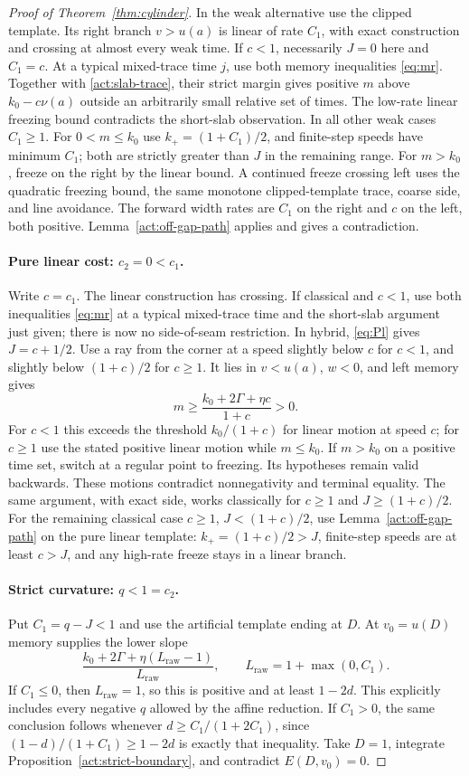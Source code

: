 \begin{proof}[Proof of Theorem~\ref{thm:cylinder}]
In the weak alternative use the clipped template.  Its right
branch $v>u(a)$ is linear of rate $C_1$, with exact construction
and crossing at almost every weak time.  If $c<1$, necessarily
$J=0$ here and $C_1=c$.  At a typical mixed-trace time $j$, use
both memory inequalities \eqref{eq:mr}.  Together with
\eqref{act:slab-trace}, their strict margin gives positive $m$
above $k_0-c\nu(a)$ outside an arbitrarily small relative set
of times.  The low-rate linear freezing bound contradicts the
short-slab observation.  In all other weak cases $C_1\ge1$.
For $0<m\le k_0$ use $k_+=(1+C_1)/2$, and finite-step speeds
have minimum $C_1$; both are strictly greater than $J$ in the
remaining range.  For $m>k_0$, freeze on the right by the linear
bound.  A continued freeze crossing left uses the quadratic
freezing bound, the same monotone clipped-template trace,
coarse side, and line avoidance.  The forward width rates are
$C_1$ on the right and $c$ on the left, both positive.
Lemma~\ref{act:off-gap-path} applies and gives a contradiction.

\paragraph{Pure linear cost: $c_2=0<c_1$.}
Write $c=c_1$.  The linear construction has crossing.
If classical and $c<1$, use both inequalities \eqref{eq:mr}
at a typical mixed-trace time and the short-slab argument just
given; there is now no side-of-seam restriction.
In hybrid, \eqref{eq:Pl} gives $J=c+1/2$.  Use a ray from the
corner at a speed slightly below $c$ for $c<1$, and slightly
below $(1+c)/2$ for $c\ge1$.  It lies in $v<u(a)$, $w<0$,
and left memory gives
\[
 m\ge\frac{k_0+2\Gamma+\eta c}{1+c}>0.
\]
For $c<1$ this exceeds the threshold $k_0/(1+c)$ for linear
motion at speed $c$; for $c\ge1$ use the stated positive
linear motion while $m\le k_0$.  If $m>k_0$ on a positive
time set, switch at a regular point to freezing.  Its hypotheses
remain valid backwards.  These motions contradict nonnegativity
and terminal equality.  The same argument, with exact side,
works classically for $c\ge1$ and $J\ge(1+c)/2$.
For the remaining classical case $c\ge1$, $J<(1+c)/2$, use
Lemma~\ref{act:off-gap-path} on the pure linear template:
$k_+=(1+c)/2>J$, finite-step speeds are at least $c>J$,
and any high-rate freeze stays in a linear branch.

\paragraph{Strict curvature: $q<1=c_2$.}
Put $C_1=q-J<1$ and use the artificial template ending at $D$.
At $v_0=u(D)$ memory supplies the lower slope
\[
 \frac{k_0+2\Gamma+\eta(L_{\mathrm{raw}}-1)}{L_{\mathrm{raw}}},
 \qquad L_{\mathrm{raw}}=1+\max(0,C_1).
\]
If $C_1\le0$, then $L_{\mathrm{raw}}=1$, so this is positive
and at least $1-2d$.  This explicitly includes every negative
$q$ allowed by the affine reduction.  If $C_1>0$, the same
conclusion follows whenever
$d\ge C_1/(1+2C_1)$, since
$(1-d)/(1+C_1)\ge1-2d$ is exactly that inequality.
Take $D=1$, integrate Proposition~\ref{act:strict-boundary},
and contradict $E(D,v_0)=0$.


\end{proof}
